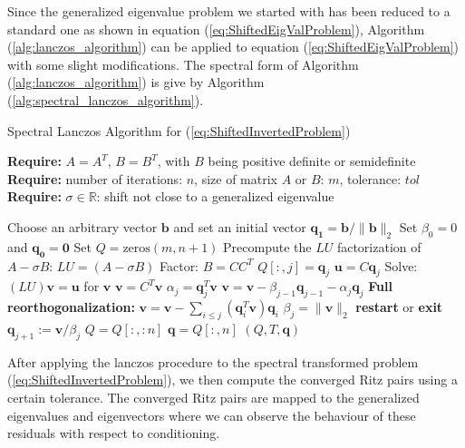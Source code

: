 Since the generalized eigenvalue problem we started with has been reduced to a standard one as shown in equation (\ref{eq:ShiftedEigValProblem}), Algorithm (\ref{alg:lanczos_algorithm}) can be applied to equation (\ref{eq:ShiftedEigValProblem}) with some slight modifications. The spectral form of Algorithm (\ref{alg:lanczos_algorithm}) is give by Algorithm (\ref{alg:spectral_lanczos_algorithm}).
\begin{algorithm}
	\caption{Spectral Lanczos Algorithm for (\ref{eq:ShiftedInvertedProblem}) }
	\label{alg:spectral_lanczos_algorithm}
	
	\textbf{Require:} \( A = A^T \), \( B = B^T \), with \(B\) being positive definite or semidefinite\\
	\textbf{Require:} number of iterations: \(n\), size of matrix $A$ or $B$: $m$, tolerance: \(tol\)\\
	\textbf{Require:} \(\sigma \in \mathbb{R}\): shift not close to a generalized eigenvalue
	\begin{algorithmic}[1]
		\State Choose an arbitrary vector $\mathbf{b}$ and set an initial vector $\mathbf{q_1} = \mathbf{b}/ \|\mathbf{b}\|_2$
		\State Set $\beta_0 = 0$ and $\mathbf{q_0} = \mathbf{0}$
		\State Set $Q = \text{zeros}(m, n+1)$
		\State Precompute the $LU$ factorization of $A - \sigma B$: $LU = (A - \sigma B)$
		\State Factor: $B = CC^T$
		\State $Q[:, j] = \mathbf{q}_j$
		\State $\mathbf{u} = C\mathbf{q}_j$
		\State Solve: $(LU)\mathbf{v} = \mathbf{u}$ for $\mathbf{v}$
		\State $\mathbf{v} = C^T \mathbf{v}$
		\State $\alpha_j = \mathbf{q}_j^T \mathbf{v} $
		\State $\mathbf{v} = \mathbf{v} - \beta_{j-1}\mathbf{q}_{j-1} - \alpha_j \mathbf{q}_j$
		\State \textbf{Full reorthogonalization:} $\mathbf{v} = \mathbf{v} - \sum_{i \leq j} (\mathbf{q}_i^T \mathbf{v}) \mathbf{q}_i$
		\State $\beta_{j} = \|\mathbf{v}\|_2$
		\State \textbf{restart} or \textbf{exit}
		\EndIf
		\State $\mathbf{q}_{j+1} := \mathbf{v} / \beta_{j}$
		\EndIf
		\EndFor
		\State $Q = Q[:, :n]$
		\State $\mathbf{q} = Q[:, n]$
		\State \Return $(Q, T, \mathbf{q})$
		\EndFunction
	\end{algorithmic}
\end{algorithm}
After applying the lanczos procedure to the spectral transformed problem (\ref{eq:ShiftedInvertedProblem}), we then compute the converged Ritz pairs using a certain tolerance. The converged Ritz pairs are mapped to the generalized eigenvalues and eigenvectors where we can observe the behaviour of these residuals with respect to conditioning.
